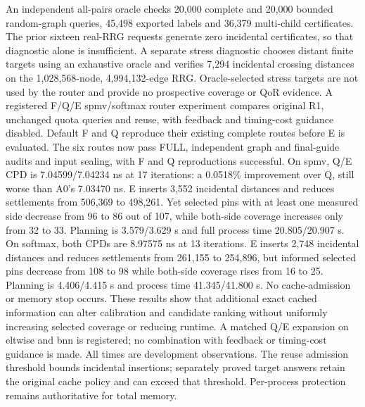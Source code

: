 \documentclass[conference,10pt]{IEEEtran}
\begin{document}
An independent all-pairs oracle checks 20,000 complete and 20,000 bounded random-graph queries, 45,498 exported labels and 36,379 multi-child certificates. The prior sixteen real-RRG requests generate zero incidental certificates, so that diagnostic alone is insufficient. A separate stress diagnostic chooses distant finite targets using an exhaustive oracle and verifies 7,294 incidental crossing distances on the 1,028,568-node, 4,994,132-edge RRG. Oracle-selected stress targets are not used by the router and provide no prospective coverage or QoR evidence. A registered F/Q/E spmv/softmax router experiment compares original R1, unchanged quota queries and reuse, with feedback and timing-cost guidance disabled. Default F and Q reproduce their existing complete routes before E is evaluated. The six routes now pass FULL, independent graph and final-guide audits and input sealing, with F and Q reproductions successful. On spmv, Q/E CPD is 7.04599/7.04234 ns at 17 iterations: a 0.0518\% improvement over Q, still worse than A0's 7.03470 ns. E inserts 3,552 incidental distances and reduces settlements from 506,369 to 498,261. Yet selected pins with at least one measured side decrease from 96 to 86 out of 107, while both-side coverage increases only from 32 to 33. Planning is 3.579/3.629 s and full process time 20.805/20.907 s. On softmax, both CPDs are 8.97575 ns at 13 iterations. E inserts 2,748 incidental distances and reduces settlements from 261,155 to 254,896, but informed selected pins decrease from 108 to 98 while both-side coverage rises from 16 to 25. Planning is 4.406/4.415 s and process time 41.345/41.800 s. No cache-admission or memory stop occurs. These results show that additional exact cached information can alter calibration and candidate ranking without uniformly increasing selected coverage or reducing runtime. A matched Q/E expansion on eltwise and bnn is registered; no combination with feedback or timing-cost guidance is made. All times are development observations. The reuse admission threshold bounds incidental insertions; separately proved target answers retain the original cache policy and can exceed that threshold. Per-process protection remains authoritative for total memory.
\end{document}
